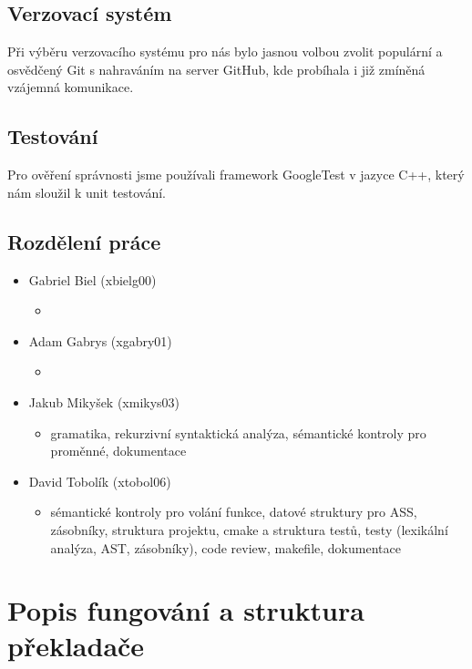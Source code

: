 \documentclass[a4paper, 12pt]{article}
\begin{document}
        \subsection{Verzovací systém}
            Při výběru verzovacího systému pro nás bylo jasnou volbou zvolit populární a osvědčený Git s nahraváním na server GitHub, kde probíhala i již zmíněná vzájemná komunikace.
        \subsection{Testování}
            Pro ověření správnosti jsme používali framework GoogleTest v jazyce C++, který nám sloužil k unit testování.
        \subsection{Rozdělení práce}
            \begin{itemize}
                \item Gabriel Biel (xbielg00)
                    \begin{itemize}
                        \item
                    \end{itemize}
                \item Adam Gabrys (xgabry01)
                    \begin{itemize}
                        \item
                    \end{itemize}
                \item Jakub Mikyšek (xmikys03)
                    \begin{itemize}
                        \item gramatika, rekurzivní syntaktická analýza, sémantické kontroly pro proměnné, dokumentace
                    \end{itemize}
                \item David Tobolík (xtobol06)
                    \begin{itemize}
                        \item sémantické kontroly pro volání funkce, datové struktury pro ASS, zásobníky, struktura projektu, cmake a struktura testů, testy (lexikální analýza, AST, zásobníky), code review, makefile, dokumentace
                    \end{itemize}
            \end{itemize}

    \section{Popis fungování a struktura překladače}
\end{document}
